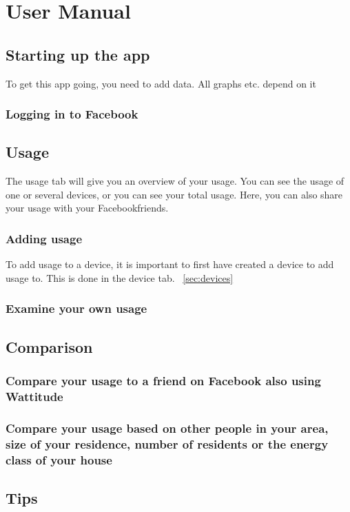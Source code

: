 \chapter{User Manual}

\section{Starting up the app}
To get this app going, you need to add data. All graphs etc. depend on it
\subsection{Logging in to Facebook}

\section{Usage}
The usage tab will give you an overview of your usage. You can see the usage of one or several devices, or you can see your total usage. Here, you can also share your usage with your Facebookfriends.
\subsection{Adding usage}
To add usage to a device, it is important to first have created a device to add usage to. This is done in the device tab. ~\ref{sec:devices}
\subsection{Examine your own usage}

\section{Comparison}
\subsection{Compare your usage to a friend on Facebook also using Wattitude}
\subsection{Compare your usage based on other people in your area, size of your residence, number of residents or the energy class of your house}

\section{Tips}
